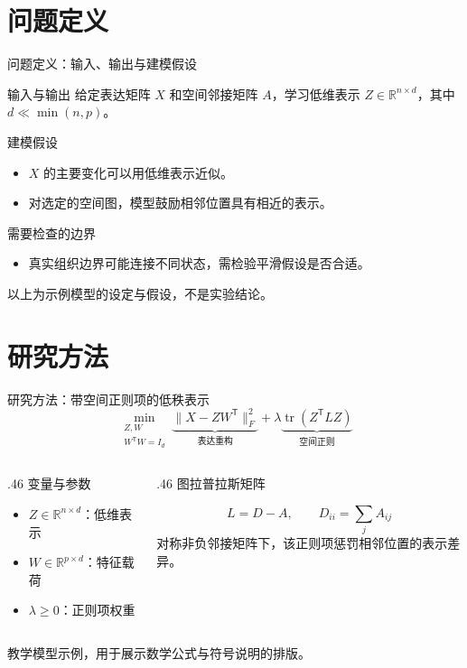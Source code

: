 \documentclass[aspectratio=169,11pt]{beamer}
\newcommand{\smallnote}[1]{\par{\scriptsize\color{NoteGray}#1\par}}
\newcommand{\bluelabel}[1]{{\color{AcademicBlue}#1}\par}
\newcommand{\spaceditem}{\setlength{\itemsep}{.65em}}
\begin{document}
\section{问题定义}
\begin{frame}{问题定义：输入、输出与建模假设}
  \begin{block}{输入与输出}
    给定表达矩阵 $X$ 和空间邻接矩阵 $A$，学习低维表示
    $Z\in\mathbb{R}^{n\times d}$，其中 $d\ll\min(n,p)$。
  \end{block}
  \vspace{4mm}
  \bluelabel{建模假设}
  \begin{itemize}\spaceditem
    \item $X$ 的主要变化可以用低维表示近似。
    \item 对选定的空间图，模型鼓励相邻位置具有相近的表示。
  \end{itemize}
  \vspace{4mm}
  \bluelabel{需要检查的边界}
  \begin{itemize}
    \item 真实组织边界可能连接不同状态，需检验平滑假设是否合适。
  \end{itemize}
  \vfill
  \smallnote{以上为示例模型的设定与假设，不是实验结论。}
\end{frame}

\section{研究方法}
\begin{frame}{研究方法：带空间正则项的低秩表示}
  \[
    \min_{\substack{Z,W\\W^{\mathsf T}W=I_d}}
    \underbrace{\lVert X-ZW^{\mathsf T}\rVert_F^2}_{\text{表达重构}}
    +\lambda\underbrace{\operatorname{tr}(Z^{\mathsf T}LZ)}_{\text{空间正则}}
  \]
  \vspace{5mm}
  \begin{columns}[T,onlytextwidth]
    \begin{column}{.46\textwidth}
      \bluelabel{变量与参数}
      \begin{itemize}\spaceditem
        \item $Z\in\mathbb{R}^{n\times d}$：低维表示
        \item $W\in\mathbb{R}^{p\times d}$：特征载荷
        \item $\lambda\geq0$：正则项权重
      \end{itemize}
    \end{column}
    \begin{column}{.46\textwidth}
      \bluelabel{图拉普拉斯矩阵}
      \[
        L=D-A,\qquad D_{ii}=\sum_j A_{ij}
      \]
      \small 对称非负邻接矩阵下，该正则项惩罚相邻位置的表示差异。
    \end{column}
  \end{columns}
  \vfill
  \smallnote{教学模型示例，用于展示数学公式与符号说明的排版。}
\end{frame}
\end{document}

